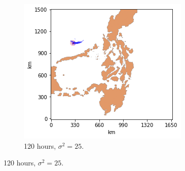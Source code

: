 \documentclass[11pt, english]{article}
\begin{document}
\begin{multicols}{2}
\begin{figure}
	\begin{subfigure}{0.33\textwidth}
		\centering
		\caption{120 hours, $\sigma^{2} = 25$.}
		\label{fig:toy-120-100}
		\includegraphics[width=\textwidth]{toy-120-100}
	\end{subfigure}
\end{figure}


\end{multicols}
\end{document}
